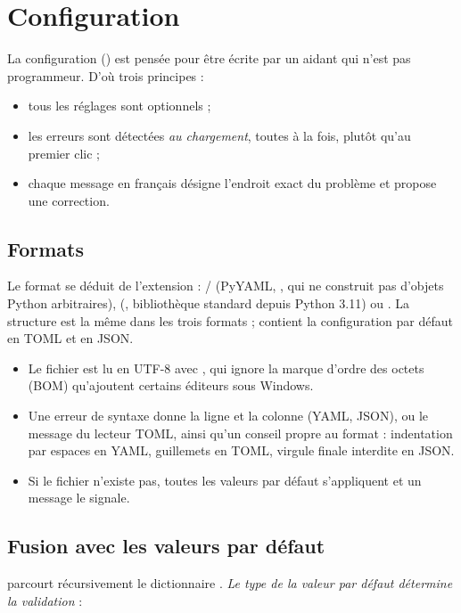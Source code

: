 \chapter{Configuration}
\label{chap:config}

La configuration () est pensée pour être écrite par un aidant qui n'est pas programmeur. D'où trois principes :
\begin{itemize}
  \item tous les réglages sont optionnels ;
  \item les erreurs sont détectées \emph{au chargement}, toutes à la fois, plutôt qu'au premier clic ;
  \item chaque message en français désigne l'endroit exact du problème et propose une correction.
\end{itemize}

\section{Formats}

Le format se déduit de l'extension : / (PyYAML, , qui ne construit pas d'objets Python arbitraires),  (, bibliothèque standard depuis Python 3.11) ou . La structure est la même dans les trois formats ;  contient la configuration par défaut en TOML et en JSON.

\begin{itemize}
  \item Le fichier est lu en UTF-8 avec , qui ignore la marque d'ordre des octets (BOM) qu'ajoutent certains éditeurs sous Windows.
  \item Une erreur de syntaxe donne la ligne et la colonne (YAML, JSON), ou le message du lecteur TOML, ainsi qu'un conseil propre au format : indentation par espaces en YAML, guillemets en TOML, virgule finale interdite en JSON.
  \item Si le fichier n'existe pas, toutes les valeurs par défaut s'appliquent et un message le signale.
\end{itemize}

\section{Fusion avec les valeurs par défaut}

 parcourt récursivement le dictionnaire . \emph{Le type de la valeur par défaut détermine la validation} :

